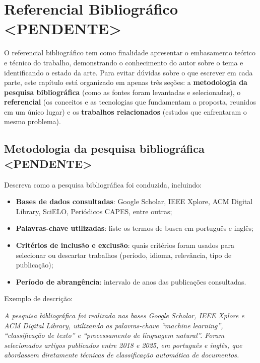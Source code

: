 \documentclass[
    12pt,                %
    openright,           %
    oneside,             %
    a4paper,             %
    english,             %
    brazil               %
]{abntex2}
\begin{document}
\chapter{Referencial Bibliográfico <PENDENTE>}
\label{cap:referencial}

O referencial bibliográfico tem como finalidade apresentar o embasamento teórico e técnico do trabalho, demonstrando o conhecimento do autor sobre o tema e identificando o estado da arte. Para evitar dúvidas sobre o que escrever em cada parte, este capítulo está organizado em apenas três seções: a \textbf{metodologia da pesquisa bibliográfica} (como as fontes foram levantadas e selecionadas), o \textbf{referencial} (os conceitos e as tecnologias que fundamentam a proposta, reunidos em um único lugar) e os \textbf{trabalhos relacionados} (estudos que enfrentaram o mesmo problema).

\section{Metodologia da pesquisa bibliográfica <PENDENTE>}
\label{sec:metodologia_pesquisa}

Descreva como a pesquisa bibliográfica foi conduzida, incluindo:

\begin{itemize}
    \item \textbf{Bases de dados consultadas}: Google Scholar, IEEE Xplore, ACM Digital Library, SciELO, Periódicos CAPES, entre outras;
    \item \textbf{Palavras-chave utilizadas}: liste os termos de busca em português e inglês;
    \item \textbf{Critérios de inclusão e exclusão}: quais critérios foram usados para selecionar ou descartar trabalhos (período, idioma, relevância, tipo de publicação);
    \item \textbf{Período de abrangência}: intervalo de anos das publicações consultadas.
\end{itemize}

Exemplo de descrição:

\textit{A pesquisa bibliográfica foi realizada nas bases Google Scholar, IEEE Xplore e ACM Digital Library, utilizando as palavras-chave ``machine learning'', ``classificação de texto'' e ``processamento de linguagem natural''. Foram selecionados artigos publicados entre 2018 e 2025, em português e inglês, que abordassem diretamente técnicas de classificação automática de documentos.}
\end{document}
